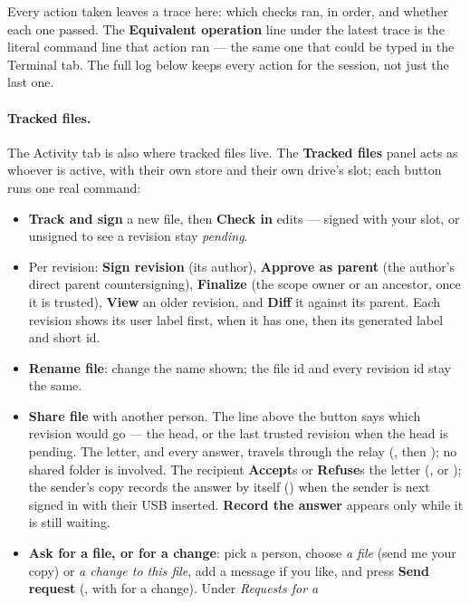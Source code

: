 Every action taken leaves a trace here: which checks ran, in order, and
whether each one passed. The \textbf{Equivalent operation} line under the
latest trace is the literal command line that action ran --- the same one
that could be typed in the Terminal tab. The full log below keeps every
action for the session, not just the last one.

\paragraph{Tracked files.} The Activity tab is also where tracked files
live. The \textbf{Tracked files} panel acts as whoever is active, with their
own store and their own drive's slot; each button runs one real
 command:

\begin{itemize}
  \item \textbf{Track and sign} a new file, then \textbf{Check in} edits ---
  signed with your slot, or unsigned to see a revision stay
  \emph{pending}.
  \item Per revision: \textbf{Sign revision} (its author),
  \textbf{Approve as parent} (the author's direct parent countersigning),
  \textbf{Finalize} (the scope owner or an ancestor, once it is trusted),
  \textbf{View} an older revision, and \textbf{Diff} it against its parent.
  Each revision shows its user label first, when it has one, then its
  generated label and short id.
  \item \textbf{Rename file}: change the name shown; the file id and every
  revision id stay the same.
  \item \textbf{Share file} with another person. The line above the button
  says which revision would go --- the head, or the last trusted revision
  when the head is pending. The letter, and every answer, travels through
  the relay (, then ); no shared folder is
  involved. The recipient \textbf{Accept}s or
  \textbf{Refuse}s the letter (, or );
  the sender's copy records the answer by itself
  () when the sender is next signed in with their
  USB inserted. \textbf{Record the answer} appears only while it is still
  waiting.
  \item \textbf{Ask for a file, or for a change}: pick a person, choose
  \emph{a file} (send me your copy) or \emph{a change to this file}, add a
  message if you like, and press \textbf{Send request} (, with  for a change). Under \emph{Requests for a
}
\end{itemize}
